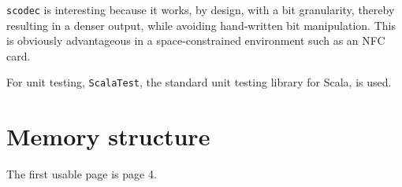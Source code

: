 \documentclass[paper=a4, fontsize=11pt]{scrartcl}
\begin{document}
\texttt{scodec} is interesting because it works, by design, with a bit
granularity, thereby resulting in a denser output, while avoiding hand-written
bit manipulation.
This is obviously advantageous in a space-constrained environment such as an NFC
card.


For unit testing, \texttt{ScalaTest}, the standard unit testing library for
Scala, is used.

\section{Memory structure}

The first usable page is page 4.
\end{document}
